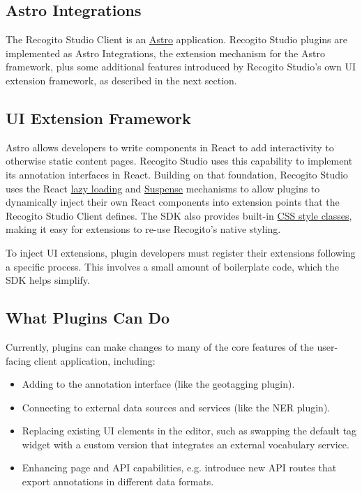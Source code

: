 \documentclass[final]{anthology-ch}         %
\begin{document}
\subsection{Astro Integrations} \label{sec:plugins_astro_integrations}

The Recogito Studio Client is an \href{https://astro.build}{Astro} application. Recogito Studio plugins are implemented as Astro Integrations, the extension mechanism for the Astro framework, plus some additional features introduced by Recogito Studio's own UI extension framework, as described in the next section.

\subsection{UI Extension Framework} \label{sec:plugins_ui_extension}

Astro allows developers to write components in React to add interactivity to otherwise static content pages. Recogito Studio uses this capability to implement its annotation interfaces in React. Building on that foundation, Recogito Studio uses the React \href{https://react.dev/reference/react/lazy#suspense-for-code-splitting}{lazy loading} and \href{https://react.dev/reference/react/Suspense}{Suspense} mechanisms to allow plugins to dynamically inject their own React components into extension points that the Recogito Studio Client defines. The SDK also provides built-in \href{https://recogitostudio.org/guides/sdk/#component-styling}{CSS style classes}, making it easy for extensions to re-use Recogito's native styling.

To inject UI extensions, plugin developers must register their extensions following a specific process. This involves a small amount of boilerplate code, which the SDK helps simplify.

\subsection{What Plugins Can Do} \label{sec:plugins_capabilities}
Currently, plugins can make changes to many of the core features of the user-facing client application, including:
\begin{itemize}
  \item Adding to the annotation interface (like the geotagging plugin).
  \item Connecting to external data sources and services (like the NER plugin).
  \item Replacing existing UI elements in the editor, such as swapping the default tag widget with a custom version that integrates an external vocabulary service.
  \item Enhancing page and API capabilities, e.g. introduce new API routes that export annotations in different data formats.

\end{itemize}
\end{document}
